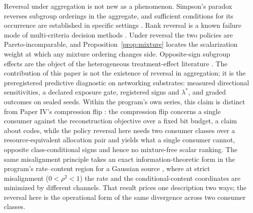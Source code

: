 \documentclass[11pt]{article}
\theoremstyle{definition}
\theoremstyle{remark}
\newcommand{\lamstar}{\lambda^{*}}
\begin{document}
Reversal under aggregation is not new as a phenomenon. Simpson's paradox
reverses subgroup orderings in the aggregate, and sufficient conditions for
its occurrence are established in specific settings
\cite{simpson1951,haunsperger2023}. Rank reversal is a known failure mode of
multi-criteria decision methods \cite{beltongear1983}. Under reversal the
two policies are Pareto-incomparable, and Proposition~\ref{prop:mixture}
locates the scalarization weight at which any mixture ordering changes side.
Opposite-sign subgroup effects are the object of the heterogeneous
treatment-effect literature \cite{athey2016}. The contribution of this
paper is not the existence of reversal in aggregation; it is the
preregistered predictive diagnostic on networking substrates: measured
directional sensitivities, a declared exposure gate, registered signs and
$\lamstar$, and graded outcomes on sealed seeds. Within the program's own
series, this claim is distinct from Paper IV's compression flip
\cite{paperiv}: the compression flip concerns a single consumer against the
reconstruction objective over a fixed bit budget, a claim about codes, while
the policy reversal here needs two consumer classes over a
resource-equivalent allocation pair and yields what a single consumer
cannot, opposite class-conditional signs and hence no mixture-free scalar
ranking. The same misalignment principle takes an exact information-theoretic
form in the program's rate--content region for a Gaussian source
\cite{bondtit}, where at strict misalignment ($0<\rho^2<1$) the rate and the
conditional-content coordinates are minimized by different channels. That result
prices one description two ways; the reversal here is the operational form of the
same divergence across two consumer classes.
\end{document}
